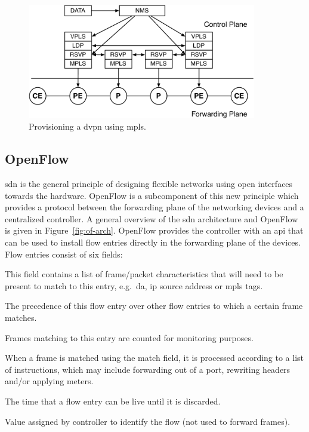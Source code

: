 \begin{figure}[!h]
	\centering
	\includegraphics[width=10cm]{./includes/nms-stack.pdf}
	\caption{Provisioning a \ac{dvpn} using \ac{mpls}.}
	\label{fig:nms-stack}
\end{figure}


\subsection{OpenFlow} %
\label{sub:openflow}

\acl{sdn} is the general principle of designing flexible networks using open interfaces towards the hardware. OpenFlow is a subcomponent of this new principle which provides a protocol between the forwarding plane of the networking devices and a centralized controller. A general overview of the \ac{sdn} architecture and OpenFlow is given in Figure~\ref{fig:of-arch}. OpenFlow provides the controller with an \ac{api} that can be used to install flow entries directly in the forwarding plane of the devices. Flow entries consist of six fields:

\begin{description}[leftmargin=!,labelwidth=\widthof{\bfseries Instructions}]
	\item[Match] This field contains a list of frame/packet characteristics that will need to be present to match to this entry, e.g.\ \ac{da}, \ac{ip} source address or \ac{mpls} tags.
	\item[Priority] The precedence of this flow entry over other flow entries to which a certain frame matches.
	\item[Counters] Frames matching to this entry are counted for monitoring purposes.
	\item[Instructions] When a frame is matched using the match field, it is processed according to a list of instructions, which may include forwarding out of a port, rewriting headers and/or applying meters.
	\item[Timeouts] The time that a flow entry can be live until it is discarded.
	\item[Cookie] Value assigned by controller to identify the flow (not used to forward frames).
\end{description}

